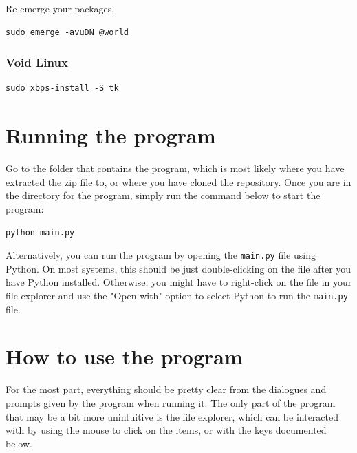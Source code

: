 \documentclass[11pt]{article}
\begin{document}
 \noindent Re-emerge your packages.
\begin{verbatim}
sudo emerge -avuDN @world
\end{verbatim}

\subsubsection{Void Linux}
\label{sec:org286f1a9}
\begin{verbatim}
sudo xbps-install -S tk
\end{verbatim}


\section{Running the program}
\label{sec:org976a63c}
Go to the folder that contains the program, which is most likely where you have extracted the zip file to, or where you have cloned the repository. Once you are in the directory for the program, simply run the command below to start the program:
\begin{verbatim}
python main.py
\end{verbatim}

Alternatively, you can run the program by opening the \texttt{main.py} file using Python. On most systems, this should be just double-clicking on the file after you have Python installed. Otherwise, you might have to right-click on the file in your file explorer and use the "Open with" option to select Python to run the \texttt{main.py} file.


\section{How to use the program}
\label{sec:orgd5727d9}
For the most part, everything should be pretty clear from the dialogues and prompts given by the program when running it. The only part of the program that may be a bit more unintuitive is the file explorer, which can be interacted with by using the mouse to click on the items, or with the keys documented below.
\end{document}
